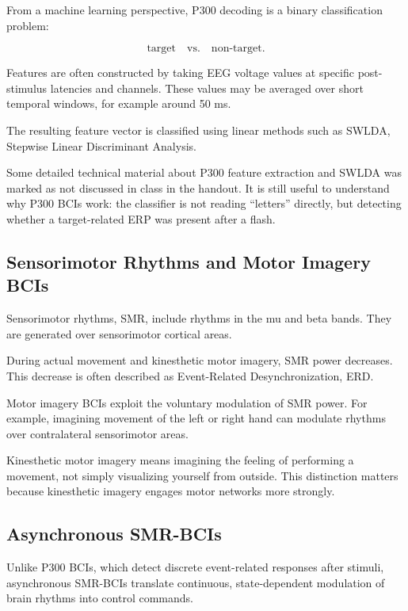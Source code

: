 From a machine learning perspective, P300 decoding is a binary classification problem:

\[
\text{target}
\quad \text{vs.} \quad
\text{non-target}.
\]

Features are often constructed by taking EEG voltage values at specific post-stimulus latencies and channels. These values may be averaged over short temporal windows, for example around 50 ms.

The resulting feature vector is classified using linear methods such as SWLDA, Stepwise Linear Discriminant Analysis.

\begin{noexam}
Some detailed technical material about P300 feature extraction and SWLDA was marked as not discussed in class in the handout. It is still useful to understand why P300 BCIs work: the classifier is not reading ``letters'' directly, but detecting whether a target-related ERP was present after a flash.
\end{noexam}

\subsection{Sensorimotor Rhythms and Motor Imagery BCIs}

Sensorimotor rhythms, SMR, include rhythms in the mu and beta bands. They are generated over sensorimotor cortical areas.

During actual movement and kinesthetic motor imagery, SMR power decreases. This decrease is often described as Event-Related Desynchronization, ERD.

Motor imagery BCIs exploit the voluntary modulation of SMR power. For example, imagining movement of the left or right hand can modulate rhythms over contralateral sensorimotor areas.

\begin{authornote}
Kinesthetic motor imagery means imagining the feeling of performing a movement, not simply visualizing yourself from outside. This distinction matters because kinesthetic imagery engages motor networks more strongly.
\end{authornote}

\subsection{Asynchronous SMR-BCIs}

Unlike P300 BCIs, which detect discrete event-related responses after stimuli, asynchronous SMR-BCIs translate continuous, state-dependent modulation of brain rhythms into control commands.

